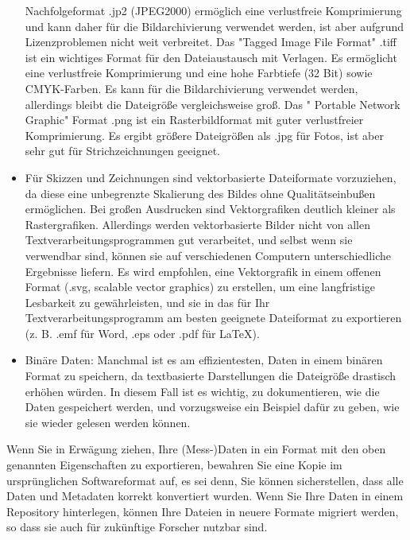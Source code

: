 \begin{itemize}
        Nachfolgeformat .jp2 (JPEG2000) ermöglich eine verlustfreie
        Komprimierung und kann daher für die Bildarchivierung verwendet werden,
        ist aber aufgrund Lizenzproblemen nicht weit verbreitet. Das
        "Tagged Image File Format" .tiff ist ein wichtiges Format für den
        Dateiaustausch mit Verlagen. Es ermöglicht eine verlustfreie
        Komprimierung und eine hohe Farbtiefe (32 Bit) sowie CMYK-Farben.
        Es kann für die Bildarchivierung verwendet werden, allerdings bleibt die
        Dateigröße vergleichsweise groß. Das " Portable Network Graphic" Format
        .png ist ein Rasterbildformat mit guter verlustfreier Komprimierung.
        Es ergibt größere Dateigrößen als .jpg für Fotos, ist aber sehr gut für
        Strichzeichnungen geeignet.
  \item Für Skizzen und Zeichnungen sind vektorbasierte Dateiformate
        vorzuziehen, da diese eine unbegrenzte Skalierung des Bildes ohne
        Qualitätseinbußen ermöglichen. Bei großen Ausdrucken sind
        Vektorgrafiken deutlich kleiner als Rastergrafiken. Allerdings werden
        vektorbasierte Bilder nicht von allen Textverarbeitungsprogrammen gut
        verarbeitet, und selbst wenn sie verwendbar sind, können sie auf
        verschiedenen Computern unterschiedliche Ergebnisse liefern. Es wird
        empfohlen, eine Vektorgrafik in einem offenen Format (.svg, scalable
        vector graphics) zu erstellen, um eine langfristige Lesbarkeit zu
        gewährleisten, und sie in das für Ihr Textverarbeitungsprogramm am
        besten geeignete Dateiformat zu exportieren (z. B. .emf für Word, .eps
        oder .pdf für LaTeX).
  \item Binäre Daten: Manchmal ist es am effizientesten, Daten in einem binären
        Format zu speichern, da textbasierte Darstellungen die Dateigröße
        drastisch erhöhen würden. In diesem Fall ist es wichtig, zu
        dokumentieren, wie die Daten gespeichert werden, und vorzugsweise ein
        Beispiel dafür zu geben, wie sie wieder gelesen werden können.
\end{itemize}

\noindent Wenn Sie in Erwägung ziehen, Ihre (Mess-)Daten in ein Format mit den
oben genannten Eigenschaften zu exportieren, bewahren Sie eine Kopie im
ursprünglichen Softwareformat auf, es sei denn, Sie können sicherstellen, dass
alle Daten und Metadaten korrekt konvertiert wurden. Wenn Sie Ihre Daten in
einem Repository hinterlegen, können Ihre Dateien in neuere Formate migriert
werden, so dass sie auch für zukünftige Forscher nutzbar sind.


